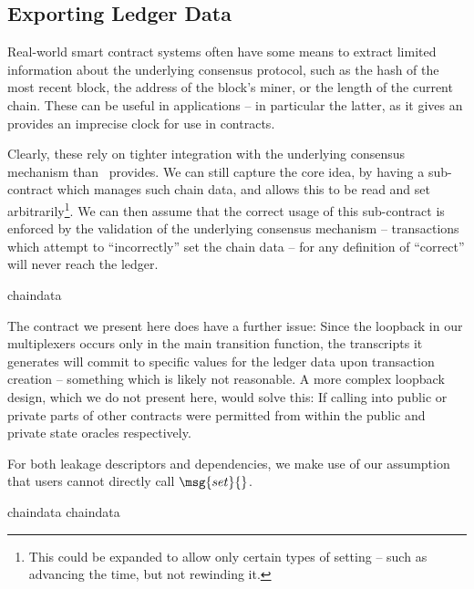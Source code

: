 \subsection{Exporting Ledger Data}

Real-world smart contract systems often have some means to extract limited
information about the underlying consensus protocol, such as the hash of the
most recent block, the address of the block's miner, or the length of the
current chain. These can be useful in applications -- in particular the latter,
as it gives an provides an imprecise clock for use in contracts.

Clearly, these rely on tighter integration with the underlying consensus
mechanism than \kachina\ provides. We can still capture the core idea, by having
a sub-contract which manages such chain data, and allows this to be read and set
arbitrarily\footnote{This could be expanded to allow only certain types of
  setting -- such as advancing the time, but not rewinding it.}. We can then
assume that the correct usage of this sub-contract is enforced by the validation
of the underlying consensus mechanism -- transactions which attempt to
``incorrectly'' set the chain data -- for any definition of ``correct'' will
never reach the ledger.

{chaindata}


The contract we present here does have a further issue: Since the loopback in
our multiplexers occurs only in the main transition function, the transcripts it
generates will commit to specific values for the ledger data upon transaction
creation -- something which is likely not reasonable. A more complex loopback
design, which we do not present here, would solve this: If calling into public
or private parts of other contracts were permitted from within the public and
private state oracles respectively.

For both leakage descriptors and dependencies, we make use of our assumption
that users cannot directly call $\msg{set}{}$.

{chaindata}
{chaindata}

